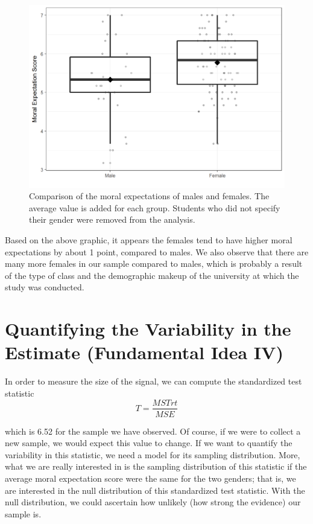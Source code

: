 \documentclass[]{book}
\theoremstyle{definition}
\theoremstyle{definition}
\theoremstyle{remark}
\begin{document}
\begin{figure}

{\centering \includegraphics[width=0.8\linewidth]{./Images/anovarecap-boxplot-1} 

}

\caption{Comparison of the moral expectations of males and females. The average value is added for each group.  Students who did not specify their gender were removed from the analysis.}\label{fig:anovarecap-boxplot}
\end{figure}

Based on the above graphic, it appears the females tend to have higher
moral expectations by about 1 point, compared to males. We also observe
that there are many more females in our sample compared to males, which
is probably a result of the type of class and the demographic makeup of
the university at which the study was conducted.

\section{Quantifying the Variability in the Estimate (Fundamental Idea
IV)}\label{quantifying-the-variability-in-the-estimate-fundamental-idea-iv-1}

In order to measure the size of the signal, we can compute the
standardized test statistic \[T = \frac{MSTrt}{MSE}\]

which is 6.52 for the sample we have observed. Of course, if we were to
collect a new sample, we would expect this value to change. If we want
to quantify the variability in this statistic, we need a model for its
sampling distribution. More, what we are really interested in is the
sampling distribution of this statistic if the average moral expectation
score were the same for the two genders; that is, we are interested in
the null distribution of this standardized test statistic. With the null
distribution, we could ascertain how unlikely (how strong the evidence)
our sample is.
\end{document}
